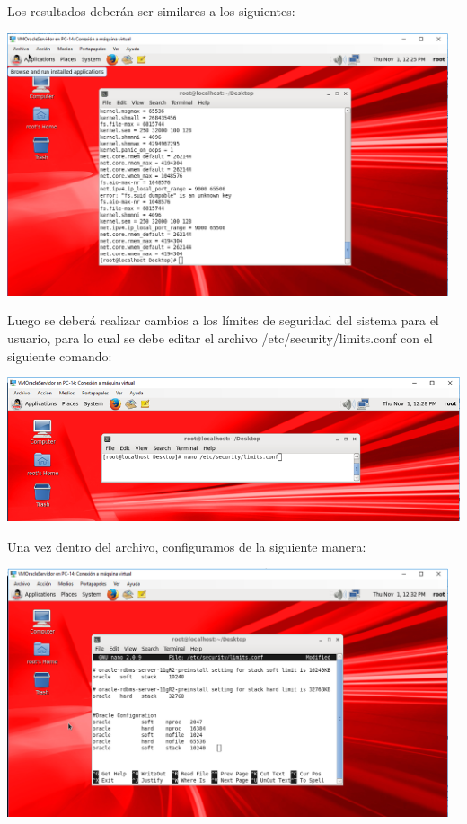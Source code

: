 \vspace{\baselineskip}

Los resultados deberán ser similares a los siguientes:
\begin{center}
	\includegraphics[width=13cm]{./Imagenes/46} 
\end{center} 

\vspace{\baselineskip}

Luego se deberá realizar cambios a los límites de seguridad del sistema para el usuario, para lo cual se debe editar el archivo /etc/security/limits.conf con el siguiente comando:
\begin{center}
	\includegraphics[width=15cm]{./Imagenes/47} 
\end{center} 

\vspace{\baselineskip}

Una vez dentro del archivo, configuramos de la siguiente manera:
\begin{center}
	\includegraphics[width=13cm]{./Imagenes/48} 
\end{center} 

